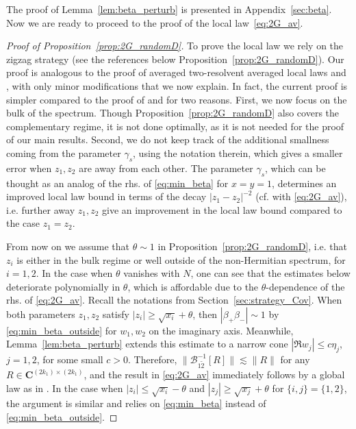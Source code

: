 \documentclass[10pt]{amsart}
\numberwithin{equation}{section}
\newcommand{\C}{\mathbf{C}}
\begin{document}
The proof of Lemma~\ref{lem:beta_perturb} is presented in Appendix~\ref{sec:beta}. Now we are ready to proceed to the proof of the local law~\eqref{eq:2G_av}.


\begin{proof}[Proof of Proposition~\ref{prop:2G_randomD}] To prove the local law we rely on the zigzag strategy (see the references below Proposition~\ref{prop:2G_randomD}). Our proof is analogous to the proof of averaged two-resolvent averaged local laws \cite[Eq.(3.26)]{nonHermdecay} and \cite[Eq.(3.16)]{univ_extr}, with only minor modifications that we now explain. In fact, the current proof is simpler compared to the proof of \cite[Eq.(3.26)]{nonHermdecay} and \cite[Eq.(3.16)]{univ_extr} for two reasons. First, we now focus on the bulk of the spectrum. Though Proposition~\ref{prop:2G_randomD} also covers the complementary regime, it is not done optimally, as it is not needed for the proof of our main results. Second, we do not keep track of the additional smallness coming from the parameter $\gamma_s$, using the notation therein, which gives a smaller error when $z_1, z_2$ are away from each other. The parameter $\gamma_s$, which can be thought as an analog of the rhs. of \eqref{eq:min_beta} for $x=y=1$, determines an improved local law bound in terms of the decay $|z_1-z_2|^{-2}$ (cf. \cite[Eq.(3.26)]{nonHermdecay} with \eqref{eq:2G_av}), i.e. further away $z_1, z_2$ give an improvement in the local law bound compared to the case $z_1=z_2$. 

From now on we assume that $\theta\sim 1$ in Proposition~\ref{prop:2G_randomD}, i.e. that $z_i$ is either in the bulk regime or well outside of the non-Hermitian spectrum, for $i=1,2$. In the case when $\theta$ vanishes with $N$, one can see that the estimates below deteriorate polynomially in $\theta$, which is affordable due to the $\theta$-dependence of the rhs. of \eqref{eq:2G_av}. Recall the notations from Section~\ref{sec:strategy_Cov}. When both parameters $z_1,z_2$ satisfy $|z_i|\ge \sqrt{x_i}+\theta$, then $|\beta_+\beta_-|\sim 1$ by \eqref{eq:min_beta_outside} for $w_1,w_2$ on the imaginary axis. Meanwhile, Lemma~\ref{lem:beta_perturb} extends this estimate to a narrow cone $|\Re w_j|\le c\eta_j$, $j=1,2$, for some small $c>0$. Therefore, $\|\mathcal{B}_{1\widetilde{2}}^{-1}[R]\|\lesssim \|R\|$ for any $R\in\C^{(2k_1)\times (2k_1)}$, and the result in \eqref{eq:2G_av} immediately follows by a global law as in  \cite[Appendix~B]{Multi_res_llaws}. In the case when $|z_i|\le \sqrt{x_i}-\theta$ and $|z_j|\ge \sqrt{x_j}+\theta$ for $\{i,j\}=\{1,2\}$, the argument is similar and relies on \eqref{eq:min_beta} instead of \eqref{eq:min_beta_outside}.



\end{proof}
\end{document}
